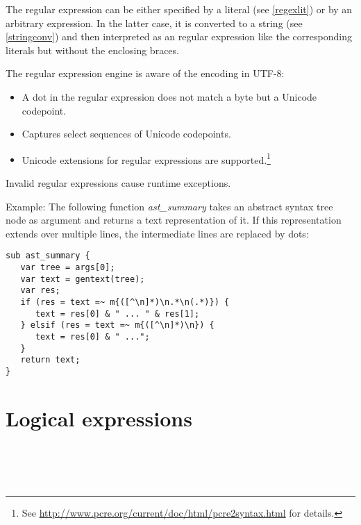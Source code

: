 The regular expression can be either specified by a literal
(see \ref{regexlit}) or by an arbitrary expression. In the latter
case, it is converted to a string (see \ref{stringconv}) and
then interpreted as an regular expression like the corresponding
literals but without the enclosing braces.

The regular expression engine is aware of the encoding
in UTF-8:
\begin{itemize}
   \item A dot in the regular expression does not match a byte
      but a Unicode codepoint.
   \item Captures select sequences of Unicode codepoints.
   \item Unicode extensions for regular expressions are
      supported.\footnote{See
      \url{http://www.pcre.org/current/doc/html/pcre2syntax.html}
      for details.}
\end{itemize}

Invalid regular expressions cause runtime exceptions.

Example: The following function \textit{ast\_summary} takes
an abstract syntax tree node as argument and returns a
text representation of it. If this representation extends over
multiple lines, the intermediate lines are replaced by dots:

\begin{lstlisting}
sub ast_summary {
   var tree = args[0];
   var text = gentext(tree);
   var res;
   if (res = text =~ m{([^\n]*)\n.*\n(.*)}) {
      text = res[0] & " ... " & res[1];
   } elsif (res = text =~ m{([^\n]*)\n}) {
      text = res[0] & " ...";
   }
   return text;
}
\end{lstlisting}

\section{Logical expressions}

\begin{grammar}
      \produces {} \\
      \produces {}
         \lextoken{\&\&}  \\
      \produces {} \\
      \produces {}
         \lextoken{\barSY\barSY} 
\end{grammar}

